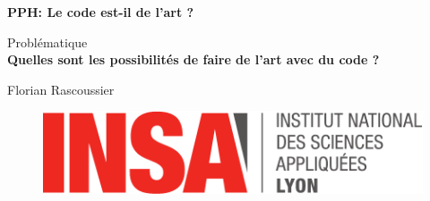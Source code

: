\begin{titlepage}
    \begin{center}
        \vspace{2cm}

        \Large
        \textbf{PPH: Le code est-il de l'art ?}

        \vspace{2cm}
        \Large
        Problématique\\
        \textbf{Quelles sont les possibilités de faire de l'art avec du code ?}
            
        \vspace{2cm}
        \normalsize
        Florian Rascoussier

        \vfill

        \begin{figure}[h]
            \centering
            \includegraphics[scale=0.7]{img/insa.pdf}
        \end{figure}
        
    \end{center}
\end{titlepage}
